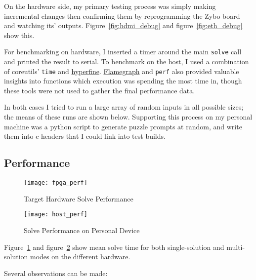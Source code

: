 \documentclass[11pt]{article}
\begin{document}
On the hardware side, my primary testing process was simply making incremental changes then confirming them by reprogramming the Zybo board and watching its' outputs.
Figure~\ref{fig:hdmi_debug} and figure~\ref{fig:eth_debug} show this.

For benchmarking on hardware, I inserted a timer around the main \verb|solve| call and printed the result to serial.
To benchmark on the host, I used a combination of coreutils' \verb|time| and \href{https://github.com/sharkdp/hyperfine}{hyperfine}.
\href{https://github.com/brendangregg/FlameGraph}{Flamegraph} and \verb|perf| also provided valuable insights into functions which execution was spending the most time in, though these tools were not used to gather the final performance data.

In both cases I tried to run a large array of random inputs in all possible sizes; the means of these runs are shown below.
Supporting this process on my personal machine was a python script to generate puzzle prompts at random, and write them into c headers that I could link into test builds.



\subsection{Performance}\label{sec:performance}

\begin{figure}[h]
  \centering
  \texttt{[image: fpga\_perf]}
  \caption{Target Hardware Solve Performance}
  \label{fig:fpga_graph}
\end{figure}

\begin{figure}[h]
  \centering
  \texttt{[image: host\_perf]}
  \caption{Solve Performance on Personal Device}
  \label{fig:laptop_graph}
\end{figure}


Figure~\ref{fig:fpga_graph} and figure~\ref{fig:laptop_graph} show mean solve time for both single-solution and multi-solution modes on the different hardware.

Several observations can be made:
\end{document}
